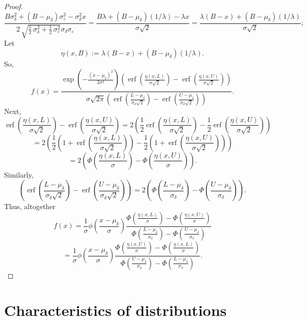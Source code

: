\documentclass{article}
\newcommand{\ep}{\varepsilon}
\newcommand{\erf}{\operatorname{erf}}
\begin{document}
\begin{proof}
	$$\frac{B \sigma_{\delta}^{2} + {\left(B - \mu_{\delta}\right)} \sigma_{\ep}^{2} - \sigma_{\delta}^{2} x}{2 \, \sqrt{\frac{1}{2} \, \sigma_{\delta}^{2} + \frac{1}{2} \, \sigma_{\ep}^{2}} \sigma_{\delta} \sigma_{\ep}} = \frac{B\lambda + (B - \mu_\delta) (1 / \lambda) - \lambda x}{\sigma \sqrt{2}} = \frac{\lambda (B - x) + (B - \mu_\delta) (1 / \lambda)}{\sigma \sqrt{2}};$$
	Let
	$$\eta(x, B) := \lambda (B - x) + (B - \mu_\delta) (1 / \lambda).$$
	So,
	$$f(x) = \frac{\exp\left(-\frac{(x - \mu_\delta)^2}{2\sigma^2}\right) \left(\erf\left(\frac{\eta(x, L)}{\sigma \sqrt{2}}\right) - \erf\left(\frac{\eta(x, U)}{\sigma \sqrt{2}}\right)\right)}{\sigma\sqrt{2\pi}\left(\erf\left(\frac{L - \mu_\delta}{\sigma_\delta\sqrt{2}}\right) - \erf\left(\frac{U - \mu_\delta}{\sigma_\delta\sqrt{2}}\right)\right)}.$$
	Next,
	$$\erf\left(\frac{\eta(x, L)}{\sigma \sqrt{2}}\right) - \erf\left(\frac{\eta(x, U)}{\sigma \sqrt{2}}\right) = 2\left(\frac12 \erf\left(\frac{\eta(x, L)}{\sigma \sqrt{2}}\right) - \frac12\erf\left(\frac{\eta(x, U)}{\sigma \sqrt{2}}\right)\right)$$
	$$= 2\left(\frac12 \left(1 + \erf\left(\frac{\eta(x, L)}{\sigma \sqrt{2}}\right)\right) - \frac12 \left(1 + \erf\left(\frac{\eta(x, U)}{\sigma \sqrt{2}}\right)\right)\right)$$
	$$= 2\left(\Phi\left(\frac{\eta(x, L)}{\sigma}\right) - \Phi\left(\frac{\eta(x, U)}{\sigma}\right)\right).$$
	Similarly,
	$$\left(\erf\left(\frac{L - \mu_\delta}{\sigma_\delta\sqrt{2}}\right) - \erf\left(\frac{U - \mu_\delta}{\sigma_\delta\sqrt{2}}\right)\right) = 2\left(\Phi\left(\frac{L - \mu_\delta}{\sigma_\delta}\right) - \Phi\left(\frac{U - \mu_\delta}{\sigma_\delta}\right)\right).$$
	Thus, altogether
	$$f(x) = \frac{1}{\sigma}\phi\left(\frac{x - \mu_\delta}{\sigma}\right) \frac{\Phi\left(\frac{\eta(x, L)}{\sigma}\right) - \Phi\left(\frac{\eta(x, U)}{\sigma}\right)}{\Phi\left(\frac{L - \mu_\delta}{\sigma_\delta}\right) - \Phi\left(\frac{U - \mu_\delta}{\sigma_\delta}\right)}$$
	$$= \frac{1}{\sigma}\phi\left(\frac{x - \mu_\delta}{\sigma}\right) \frac{\Phi\left(\frac{\eta(x, U)}{\sigma}\right) - \Phi\left(\frac{\eta(x, L)}{\sigma}\right)}{\Phi\left(\frac{U - \mu_\delta}{\sigma_\delta}\right) - \Phi\left(\frac{L - \mu_\delta}{\sigma_\delta}\right)}.$$
\end{proof}

\section{Characteristics of distributions}
\end{document}
